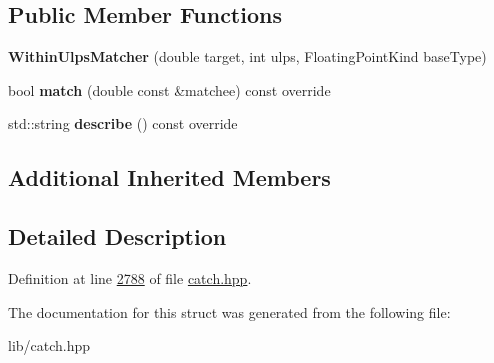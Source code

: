 \subsection*{Public Member Functions}
\begin{DoxyCompactItemize}
\item 
\mbox{\label{structCatch_1_1Matchers_1_1Floating_1_1WithinUlpsMatcher_a836074ae4010275284ab66b2485c6575}} 
{\bfseries Within\+Ulps\+Matcher} (double target, int ulps, Floating\+Point\+Kind base\+Type)
\item 
\mbox{\label{structCatch_1_1Matchers_1_1Floating_1_1WithinUlpsMatcher_aabda42a0dc5d00f3c5916feb75006b32}} 
bool {\bfseries match} (double const \&matchee) const override
\item 
\mbox{\label{structCatch_1_1Matchers_1_1Floating_1_1WithinUlpsMatcher_ad9bc8bb7f3abd326580a4bf6cf369b1b}} 
std\+::string {\bfseries describe} () const override
\end{DoxyCompactItemize}
\subsection*{Additional Inherited Members}


\subsection{Detailed Description}


Definition at line \mbox{\hyperlink{catch_8hpp_source_l02788}{2788}} of file \mbox{\hyperlink{catch_8hpp_source}{catch.\+hpp}}.



The documentation for this struct was generated from the following file\+:\begin{DoxyCompactItemize}
\item 
lib/catch.\+hpp\end{DoxyCompactItemize}
